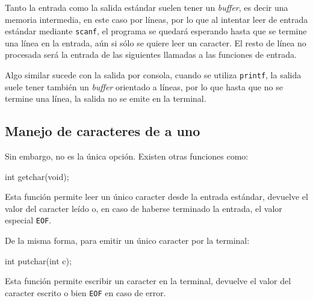 Tanto la entrada como la salida estándar suelen tener un \textit{buffer}, es
decir una memoria intermedia, en este caso por líneas, por lo que al intentar
leer de entrada estándar mediante \lstinline!scanf!, el programa se quedará
esperando hasta que se termine una línea en la entrada, aún si sólo se quiere
leer un caracter. El resto de línea no procesada será la entrada de las
siguientes llamadas a las funciones de entrada.

Algo similar sucede con la salida por consola, cuando se utiliza
\lstinline!printf!, la salida suele tener también un \textit{buffer} orientado
a líneas, por lo que hasta que no se termine una línea, la salida no se emite
en la terminal.

\subsection{Manejo de caracteres de a uno}

Sin embargo, no es la única opción.  Existen otras funciones como:

\begin{codigo-c-plano}
int getchar(void);
\end{codigo-c-plano}

Esta función permite leer un único caracter desde la entrada estándar,
devuelve el valor del caracter leído o, en caso de haberse terminado la
entrada, el valor especial \lstinline!EOF!.

De la misma forma, para emitir un único caracter por la terminal:

\begin{codigo-c-plano}
int putchar(int c);
\end{codigo-c-plano}

Esta función permite escribir un caracter en la terminal, devuelve el valor
del caracter escrito o bien \lstinline!EOF! en caso de error.



